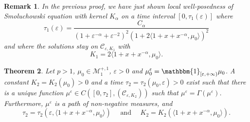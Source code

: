 \documentclass[a4paper,11pt, reqno]{amsart}
\newcommand{\cC}{\mathcal{C}}	\newcommand{\CC}{\mathbbm{C}}
\newcommand{\cM}{\mathcal{M}}	\newcommand{\MM}{\mathbbm{M}}
\newcommand{\eps}{\varepsilon}
\newcommand{\1}{\mathbbm{1}}
\theoremstyle{plain}
\newtheorem{theorem}{Theorem}[section]
\newtheorem{remark}[theorem]{Remark}
\theoremstyle{definition}
\begin{document}
\begin{remark}
  \label{remark:expression-of-small-times}In the previous proof, we have just
  shown local well-posedness of Smoluchowski equation with kernel $K_{\alpha}$
  on a time interval $[0, \tau_1 (\eps)]$ where
  \[ \tau_1 (\eps) = \frac{C_{\alpha}}{(1 + \eps^{- \alpha} +
     \eps^{- 2})^2 (1 + 2 \langle 1 + x + x^{- \alpha}, \mu_0
     \rangle)^2} \]
  and where the solutions stay on $\cC_{\eps, K_1}$ with
  \[ K_1 = 2 \langle 1 + x + x^{- \alpha}, \mu_0 \rangle . \]
\end{remark}

\begin{theorem}
  \label{theorem:solution-smolu-positive}Let $p > 1$, $\mu_0 \in
  \cM^{+, 1}_1$, $\eps > 0$ and $\mu_0^{\eps} =
  \mathbbm{1}_{[\eps, + \infty)} \mu_0$. A constant $K_2 = K_2 (\mu_0)
  > 0$ and a time $\tau_2 = \tau_2 (\mu_0, \eps) > 0$ exist such that
  there is a unique function $\mu^{\eps} \in C ([0, \tau_2],
  (\cC_{\eps, K_2}))$ such that $\mu^{\eps} = \Gamma
  (\mu^{\eps})$. Furthermore, $\mu^{\eps}$ is a path of
  \emph{non-negative} measures, and
  \[ \tau_2 = \tau_2 (\eps, \langle 1 + x + x^{- \alpha}, \mu_0
     \rangle) \quad  \text{ and } \quad K_2 = K_2 (\langle 1 + x + x^{- \alpha},
     \mu_0 \rangle) . \]
\end{theorem}
\end{document}
